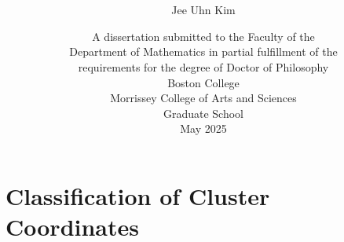 \documentclass[12pt, oneside]{book} %
\title{\vspace{-1.5in}
{\titlefont \thesistitlecaps}}
\author{{\authorfont Jee Uhn Kim}}
\date{
\vspace{1.25in}
A dissertation submitted to the Faculty of the\\
Department of Mathematics in partial fulfillment of the\\
requirements for the degree of Doctor of Philosophy\\
\vspace{1.25in}
%
{
\setstretch{1}
Boston College \\
Morrissey College of Arts and Sciences \\
Graduate School\\
}
\vspace{.25in}
%
May 2025
}
\theoremstyle{definition}
\theoremstyle{remark}
\begin{document}






\chapter{Classification of Cluster Coordinates}\label{2nd_part}
































\
\end{document}
